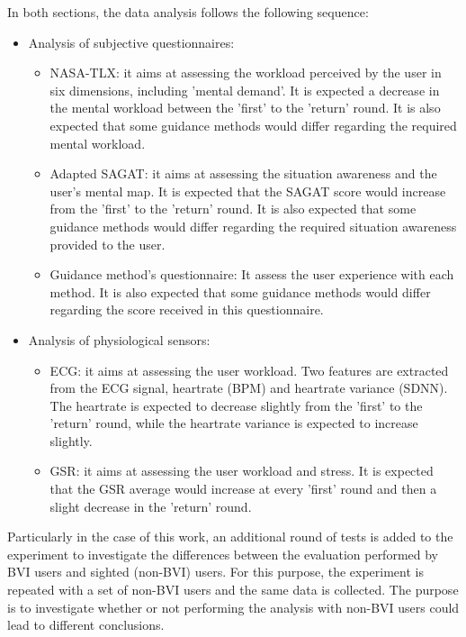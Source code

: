In both sections, the data analysis follows the following sequence:

\begin{itemize}
    \item Analysis of subjective questionnaires:
    \begin{itemize}
        \item NASA-TLX: it aims at assessing the workload perceived by the user in six dimensions, including 'mental demand'. It is expected a decrease in the mental workload between the 'first' to the 'return' round. It is also expected that some guidance methods would differ regarding the required mental workload.
        \item Adapted SAGAT: it aims at assessing the situation awareness and the user's mental map. It is expected that the SAGAT score would increase from the 'first' to the 'return' round. It is also expected that some guidance methods would differ regarding the required situation awareness provided to the user.
        \item Guidance method's questionnaire: It assess the user experience with each method. It is also expected that some guidance methods would differ regarding the score received in this questionnaire.
    \end{itemize}
    \item Analysis of physiological sensors:
    \begin{itemize}
        \item ECG: it aims at assessing the user workload. Two features are extracted from the ECG signal, heartrate (BPM) and heartrate variance (SDNN). The heartrate is expected to decrease slightly from the 'first' to the 'return' round, while the heartrate variance is expected to increase slightly.
        \item GSR: it aims at assessing the user workload and stress. It is expected that the GSR average would increase at every 'first' round and then a slight decrease in the 'return' round.
    \end{itemize}
\end{itemize}

Particularly in the case of this work, an additional round of tests is added to the experiment to investigate the differences between the evaluation performed by BVI users and sighted (non-BVI) users. For this purpose, the experiment is repeated with a set of non-BVI users and the same data is collected. The purpose is to investigate whether or not performing the analysis with non-BVI users could lead to different conclusions.


